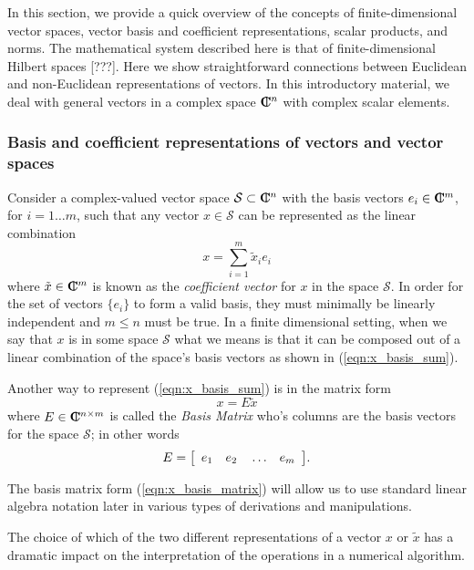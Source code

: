 In this section, we provide a quick overview of the concepts of
finite-dimensional vector spaces, vector basis and coefficient
representations, scalar products, and norms.  The mathematical system
described here is that of finite-dimensional Hilbert spaces [???].  Here we
show straightforward connections between Euclidean and non-Euclidean
representations of vectors.  In this introductory material, we deal with
general vectors in a complex space $\CPLX^n$ with complex scalar elements.

\subsubsection{Basis and coefficient representations of vectors and vector spaces}

Consider a complex-valued vector space $\mathcal{S} {}\subset \CPLX^n$ with
the basis vectors $e_i\in\CPLX^m$, for $i=1\ldots{}m$, such that any vector
$x\in\mathcal{S}$ can be represented as the linear combination
%
\begin{equation}
x = \sum_{i=1}^{m} \tilde{x}_i e_i
\label{eqn:x_basis_sum}
\end{equation}
%
where $\tilde{x}\in\CPLX^m$ is known as the {}\textit{coefficient vector} for
$x$ in the space $\mathcal{S}$.  In order for the set of vectors $\{e_i\}$ to
form a valid basis, they must minimally be linearly independent and $m {}\le
n$ must be true.  In a finite dimensional setting, when we say that $x$ is in
some space $\mathcal{S}$ what we means is that it can be composed out of a
linear combination of the space's basis vectors as shown in
(\ref{eqn:x_basis_sum}).

Another way to represent (\ref{eqn:x_basis_sum}) is in the matrix form
%
\begin{equation}
x = E \tilde{x}
\label{eqn:x_basis_matrix}
\end{equation}
%
where $E\in\CPLX^{n\times{}m}$ is called the {}\textit{Basis Matrix} who's
columns are the basis vectors for the space $\mathcal{S}$; in other words
%
\begin{equation}
E = {\bmat{cccc} e_1 & e_2 & {}\ldots & e_m {}\emat}.
\end{equation}
%

The basis matrix form (\ref{eqn:x_basis_matrix}) will allow us to use standard
linear algebra notation later in various types of derivations and
manipulations.

The choice of which of the two different representations of a vector $x$ or
$\tilde{x}$ has a dramatic impact on the interpretation of the operations in
a numerical algorithm.

